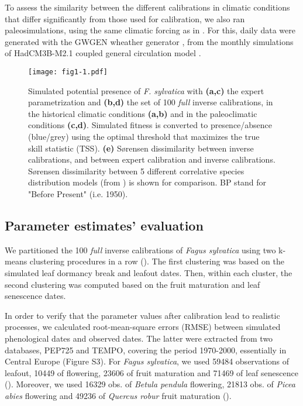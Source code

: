 \documentclass[preprint,12pt,authoryear]{elsarticle}
\begin{document}
To assess the similarity between the different calibrations in climatic conditions that differ significantly from those used for calibration, we also ran paleosimulations, using the same climatic forcing as in \citet{VanderMeersch2024}. For this, daily data were generated with the GWGEN wheather generator \citep{Sommer2017}, from the monthly simulations of HadCM3B-M2.1 coupled general circulation model \citep{Armstrong2019}.

\begin{figure}
\begin{subcaptiongroup}
\label{fig:1A} 
\label{fig:1B}
\label{fig:1C}
\label{fig:1D}
\label{fig:1E}
\end{subcaptiongroup}
\centerline{\texttt{[image: fig1-1.pdf]}}
\caption{Simulated potential presence of \emph{F. sylvatica} with \textbf{(a,c)} the expert parametrization and \textbf{(b,d)} the set of 100 \emph{full} inverse calibrations, in the historical climatic conditions \textbf{(a,b)} and in the paleoclimatic conditions \textbf{(c,d)}. Simulated fitness is converted to presence/absence (blue/grey) using the optimal threshold that maximizes the true skill statistic (TSS). \textbf{(e)} S\o rensen dissimilarity between inverse calibrations, and between expert calibration and inverse calibrations. S\o rensen dissimilarity between 5 different correlative species distribution models (from \citealp{VanderMeersch2024}) is shown for comparison. BP stand for "Before Present" (i.e. 1950).}
\label{fig:1}
\end{figure}

\subsection{Parameter estimates' evaluation}

We partitioned the 100 \emph{full} inverse calibrations of \emph{Fagus sylvatica} using two k-means clustering procedures in a row (). The first clustering was based on the simulated leaf dormancy break and leafout dates. Then, within each cluster, the second clustering was computed based on the fruit maturation and leaf senescence dates.

In order to verify that the parameter values after calibration lead to realistic processes, we calculated root-mean-square errors (RMSE) between simulated phenological dates and observed dates. The latter were extracted from two databases, PEP725 and TEMPO, covering the period 1970-2000, essentially in Central Europe (Figure S3). For \emph{Fagus sylvatica}, we used 59484 observations of leafout, 10449 of flowering, 23606 of fruit maturation and 71469 of leaf senescence (). Moreover, we used 16329 obs. of \emph{Betula pendula} flowering, 21813 obs. of \emph{Picea abies} flowering and 49236 of \emph{Quercus robur} fruit maturation ().
\end{document}
